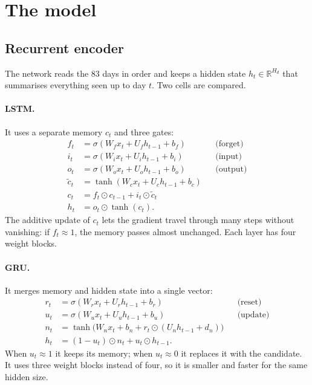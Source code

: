 \documentclass[11pt]{article}
\newcommand{\R}{\mathbb{R}}
\begin{document}
\section{The model}

\subsection{Recurrent encoder}

The network reads the 83 days in order and keeps a hidden state $h_t \in \R^{H_d}$ that summarises everything seen up to day $t$. Two cells are compared.

\paragraph{LSTM.} It uses a separate memory $c_t$ and three gates:
\begin{align}
f_t &= \sigma(W_f x_t + U_f h_{t-1} + b_f) && \text{(forget)} \\
i_t &= \sigma(W_i x_t + U_i h_{t-1} + b_i) && \text{(input)} \\
o_t &= \sigma(W_o x_t + U_o h_{t-1} + b_o) && \text{(output)} \\
\tilde c_t &= \tanh(W_c x_t + U_c h_{t-1} + b_c) \\
c_t &= f_t \odot c_{t-1} + i_t \odot \tilde c_t \\
h_t &= o_t \odot \tanh(c_t).
\end{align}
The additive update of $c_t$ lets the gradient travel through many steps without vanishing: if $f_t \approx 1$, the memory passes almost unchanged. Each layer has four weight blocks.

\paragraph{GRU.} It merges memory and hidden state into a single vector:
\begin{align}
r_t &= \sigma(W_r x_t + U_r h_{t-1} + b_r) && \text{(reset)} \\
u_t &= \sigma(W_u x_t + U_u h_{t-1} + b_u) && \text{(update)} \\
n_t &= \tanh\!\big(W_n x_t + b_n + r_t \odot (U_n h_{t-1} + d_n)\big) \\
h_t &= (1 - u_t) \odot n_t + u_t \odot h_{t-1}.
\end{align}
When $u_t \approx 1$ it keeps its memory; when $u_t \approx 0$ it replaces it with the candidate. It uses three weight blocks instead of four, so it is smaller and faster for the same hidden size.
\end{document}
